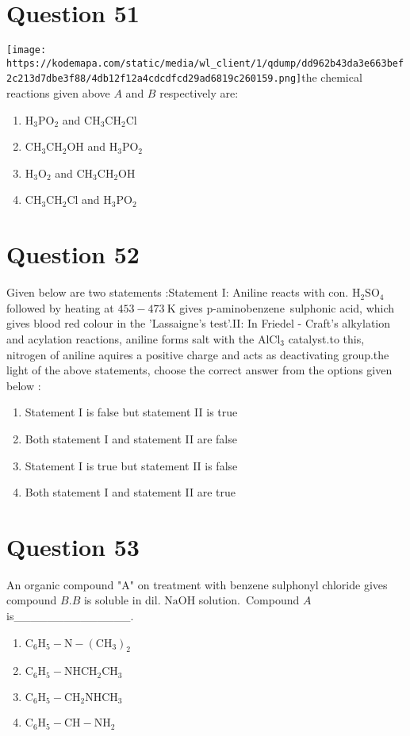 \documentclass{article}
\begin{document}
\section*{Question 51}
\texttt{[image: https://kodemapa.com/static/media/wl\_client/1/qdump/dd962b43da3e663bef2c213d7dbe3f88/4db12f12a4cdcdfcd29ad6819c260159.png]}\newlineIn the chemical reactions given above \(A\) and \(B\) respectively are: 
\begin{enumerate}[label=(\alph*)]
\item \(\mathrm{H}_3 \mathrm{PO}_2\) and \(\mathrm{CH}_3 \mathrm{CH}_2 \mathrm{Cl}\)
\item \(\mathrm{CH}_3 \mathrm{CH}_2 \mathrm{OH}\) and \(\mathrm{H}_3 \mathrm{PO}_2\)
\item \(\mathrm{H}_3 \mathrm{O}_2\) and \(\mathrm{CH}_3 \mathrm{CH}_2 \mathrm{OH}\)
\item \(\mathrm{CH}_3 \mathrm{CH}_2 \mathrm{Cl}\) and \(\mathrm{H}_3 \mathrm{PO}_2\)
\end{enumerate}
\newpage
\section*{Question 52}
Given below are two statements :Statement I: Aniline reacts with con. \(\mathrm{H}_2 \mathrm{SO}_4\) followed by heating at \(453-473 \mathrm{~K}\) gives p-aminobenzene sulphonic acid, which gives blood red colour in the 'Lassaigne's test'.\newlineStatement II: In Friedel - Craft's alkylation and acylation reactions, aniline forms salt with the \(\mathrm{AlCl}_3\) catalyst.\newlineDue to this, nitrogen of aniline aquires a positive charge and acts as deactivating group.\newlineIn the light of the above statements, choose the correct answer from the options given below :
\begin{enumerate}[label=(\alph*)]
\item Statement I is false but statement II is true
\item Both statement I and statement II are false
\item Statement I is true but statement II is false
\item Both statement I and statement II are true
\end{enumerate}
\newpage
\section*{Question 53}
An organic compound "A" on treatment with benzene sulphonyl chloride gives compound \(B . B\) is soluble in dil. \(\mathrm{NaOH}\) solution. Compound \(A\) is______________. 
\begin{enumerate}[label=(\alph*)]
\item \(\mathrm{C}_6 \mathrm{H}_5-\mathrm{N}-\left(\mathrm{CH}_3\right)_2\)
\item \(\mathrm{C}_6 \mathrm{H}_5-\mathrm{NHCH}_2 \mathrm{CH}_3\)
\item \(\mathrm{C}_6 \mathrm{H}_5-\mathrm{CH}_2 \mathrm{NHCH}_3\)
\item \(\mathrm{C}_6 \mathrm{H}_5-\mathrm{CH}-\mathrm{NH}_2\)
\end{enumerate}
\newpage
\end{document}
